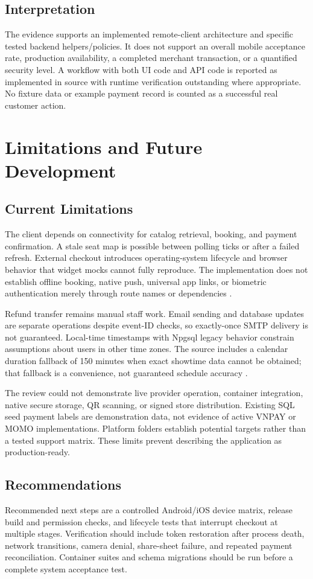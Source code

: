 \documentclass[conference]{IEEEtran}
\begin{document}
\subsection{Interpretation}
The evidence supports an implemented remote-client architecture and specific
tested backend helpers/policies. It does not support an overall mobile
acceptance rate, production availability, a completed merchant transaction,
or a quantified security level. A workflow with both UI code and API code is
reported as implemented in source with runtime verification outstanding where
appropriate. No fixture data or example payment record is counted as a
successful real customer action.

\section{Limitations and Future Development}
\subsection{Current Limitations}
The client depends on connectivity for catalog retrieval, booking, and payment
confirmation. A stale seat map is possible between polling ticks or after a
failed refresh. External checkout introduces operating-system lifecycle and
browser behavior that widget mocks cannot fully reproduce. The implementation
does not establish offline booking, native push, universal app links, or
biometric authentication merely through route names or dependencies
\cite{client}.

Refund transfer remains manual staff work. Email sending and database updates
are separate operations despite event-ID checks, so exactly-once SMTP delivery
is not guaranteed. Local-time timestamps with Npgsql legacy behavior constrain
assumptions about users in other time zones. The source includes a calendar
duration fallback of 150 minutes when exact showtime data cannot be obtained;
that fallback is a convenience, not guaranteed schedule accuracy
\cite{booking,client,deployment}.

The review could not demonstrate live provider operation, container integration,
native secure storage, QR scanning, or signed store distribution. Existing SQL
seed payment labels are demonstration data, not evidence of active VNPAY or
MOMO implementations. Platform folders establish potential targets rather
than a tested support matrix. These limits prevent describing the application
as production-ready.

\subsection{Recommendations}
Recommended next steps are a controlled Android/iOS device matrix, release
build and permission checks, and lifecycle tests that interrupt checkout at
multiple stages. Verification should include token restoration after process
death, network transitions, camera denial, share-sheet failure, and repeated
payment reconciliation. Container suites and schema migrations should be run
before a complete system acceptance test.
\end{document}
